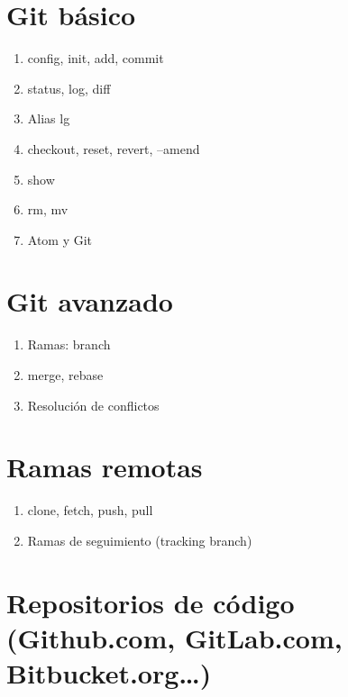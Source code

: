 \documentclass[a4paper,11pt,spanish]{sphinxmanual}
\begin{document}
\section{Git básico}
\label{\detokenize{introduccion:git-basico}}\begin{enumerate}
\item {} 
config, init, add, commit

\item {} 
status, log, diff

\item {} 
Alias lg

\item {} 
checkout, reset, revert, --amend

\item {} 
show

\item {} 
rm, mv

\item {} 
Atom y Git

\end{enumerate}


\section{Git avanzado}
\label{\detokenize{introduccion:git-avanzado}}\begin{enumerate}
\item {} 
Ramas: branch

\item {} 
merge, rebase

\item {} 
Resolución de conflictos

\end{enumerate}


\section{Ramas remotas}
\label{\detokenize{introduccion:ramas-remotas}}\begin{enumerate}
\item {} 
clone, fetch, push, pull

\item {} 
Ramas de seguimiento (tracking branch)

\end{enumerate}


\section{Repositorios de código (Github.com, GitLab.com, Bitbucket.org…)}
\label{\detokenize{introduccion:repositorios-de-codigo-github-com-gitlab-com-bitbucket-org}}
\end{document}
